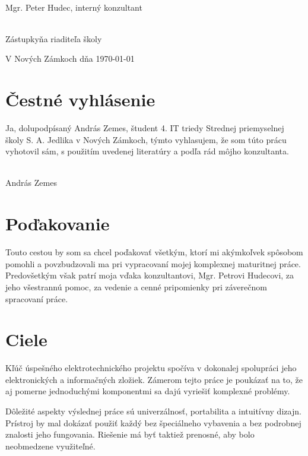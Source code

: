 \documentclass[titlepage]{article}
\begin{document}
\vspace{10mm}
\hrulefill
\\\hspace*{0mm}\phantom{v.r.: }Mgr. Peter Hudec, interný konzultant

\vspace{10mm}
\hrulefill
\\\hspace*{0mm}\phantom{v.r.: }Zástupkyňa riaditeľa školy

\vspace{10mm}
V Nových Zámkoch dňa \today


\section*{Čestné vyhlásenie}

Ja, dolupodpísaný András Zemes, študent 4. IT triedy Strednej priemyselnej školy S. A. Jedlika v Nových Zámkoch, týmto vyhlasujem, že som túto prácu   vyhotovil sám, s použitím uvedenej literatúry a podľa rád môjho konzultanta. 

\vspace{10mm}
\hrulefill
\\\hspace*{0mm}\phantom{v.r.: }András Zemes
\newpage

\section*{Poďakovanie}
Touto cestou by som sa chcel poďakovať všetkým, ktorí mi akýmkoľvek spôsobom pomohli a povzbudzovali ma pri vypracovaní mojej komplexnej maturitnej práce. Predovšetkým však patrí moja vďaka konzultantovi, Mgr. Petrovi Hudecovi, za jeho všestrannú pomoc, za vedenie a cenné pripomienky pri záverečnom spracovaní práce.

\newpage
\tableofcontents

\newpage
\section{Ciele}
Kľúč úspešného elektrotechnického projektu spočíva v dokonalej spolupráci jeho elektronických a informačných zložiek. Zámerom tejto práce je poukázať na to, že aj pomerne jednoduchými komponentmi sa dajú vyriešiť komplexné problémy. 

Dôležité aspekty výslednej práce sú univerzálnosť, portabilita a intuitívny dizajn. Prístroj by mal dokázať použiť každý bez špeciálneho vybavenia a bez podrobnej znalosti jeho fungovania. Riešenie má byť taktiež prenosné, aby bolo neobmedzene využiteľné.
\end{document}
